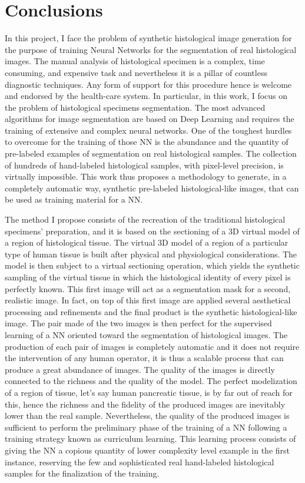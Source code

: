 \chapter*{Conclusions}
\label{chap:concl}

In this project, I face the problem of synthetic histological image generation for the purpose of training Neural Networks for the segmentation of real histological images. The manual analysis of histological specimen is a complex, time consuming, and expensive task and nevertheless it is a pillar of countless diagnostic techniques. Any form of support for this procedure hence is welcome and endorsed by the health-care system. In particular, in this work, I focus on the problem of histological specimens segmentation. The most advanced algorithms for image segmentation are based on Deep Learning and requires the training of extensive and complex neural networks. One of the toughest hurdles to overcome for the training of those NN is the abundance and the quantity of pre-labeled examples of segmentation on real histological samples. The collection of hundreds of hand-labeled histological samples, with pixel-level precision, is virtually impossible. This work thus proposes a methodology to generate, in a completely automatic way, synthetic pre-labeled histological-like images, that can be used as training material for a NN.

The method I propose consists of the recreation of the traditional histological specimens' preparation, and it is based on the sectioning of a 3D virtual model of a region of histological tissue. The virtual 3D model of a region of a particular type of human tissue is built after physical and physiological considerations. The model is then subject to a virtual sectioning operation, which yields the synthetic sampling of the virtual tissue in which the histological identity of every pixel is perfectly known. This first image will act as a segmentation mask for a second, realistic image. In fact, on top of this first image are applied several aesthetical processing and refinements and the final product is the synthetic histological-like image. The pair made of the two images is then perfect for the supervised learning of a NN oriented toward the segmentation of histological images. The production of each pair of images is completely automatic and it does not require the intervention of any human operator, it is thus a scalable process that can produce a great abundance of images. The quality of the images is directly connected to the richness and the quality of the model. The perfect modelization of a region of tissue, let's say human pancreatic tissue, is by far out of reach for this, hence the richness and the fidelity of the produced images are inevitably lower than the real sample. Nevertheless, the quality of the produced images is sufficient to perform the preliminary phase of the training of a NN following a training strategy known as curriculum learning. This learning process consists of giving the NN a copious quantity of lower complexity level example in the first instance, reserving the few and sophisticated real hand-labeled histological samples for the finalization of the training.

